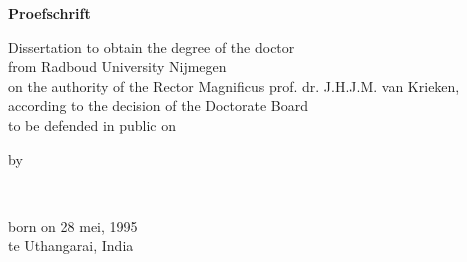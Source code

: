 \begin{titlepage}
    \begin{center}


        \vspace*{2\bigskipamount}

        {\makeatletter
            \titlestyle\bfseries\LARGE\@title
            \makeatother}

        {\makeatletter
            \ifx\@subtitle\undefined\else
                \bigskip
                \titlefont\titleshape\Large\@subtitle
            \fi
            \makeatother}

        \vfill


        {\Large\titlefont\bfseries Proefschrift}

        \bigskip
        \bigskip

        Dissertation to obtain the degree of the doctor\\
        from Radboud University Nijmegen\\
        on the authority of the Rector Magnificus prof. dr. J.H.J.M. van Krieken,\\
        according to the decision of the Doctorate Board\\
        to be defended in public on\\


        \bigskip
        \bigskip

        by

        \bigskip
        \bigskip

        \makeatletter
        {\Large\titlefont\bfseries\@firstnames\ \MakeUppercase{\titleshape\@lastname}}
        \makeatother

        \bigskip
        \bigskip

        born on 28 mei, 1995\\
        te Uthangarai, India\\

        \vspace*{2\bigskipamount}

    \end{center}
    \clearpage


\end{titlepage}
